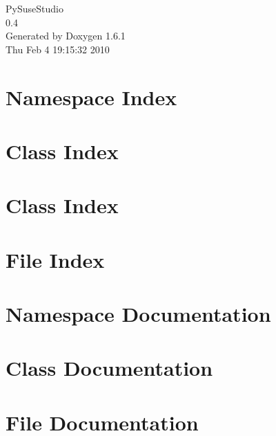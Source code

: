 \documentclass[a4paper]{book}
\begin{document}
\hypersetup{pageanchor=false}
\begin{titlepage}
\vspace*{7cm}
\begin{center}
{\Large PySuseStudio \\[1ex]\large 0.4 }\\
\vspace*{1cm}
{\large Generated by Doxygen 1.6.1}\\
\vspace*{0.5cm}
{\small Thu Feb 4 19:15:32 2010}\\
\end{center}
\end{titlepage}
\clearemptydoublepage
{}
\tableofcontents
\clearemptydoublepage
{}
\hypersetup{pageanchor=true}
\chapter{Namespace Index}

\chapter{Class Index}

\chapter{Class Index}

\chapter{File Index}

\chapter{Namespace Documentation}


\chapter{Class Documentation}




\chapter{File Documentation}


\printindex
\end{document}
